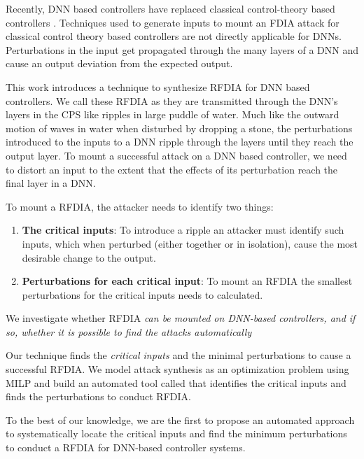 Recently,  \ac{DNN} based controllers have replaced classical control-theory based controllers \cite{xiang18} \cite{Kocic2019} \cite{bechtel2017deeppicar}.  
Techniques used to generate inputs to mount an FDIA attack for classical control theory based controllers are not directly applicable for DNNs. Perturbations in the input get propagated through the many layers of a DNN  and cause an output deviation from the expected output. 
 
This work introduces a technique to synthesize \ac{RFDIA} for DNN based controllers. 
We call these \ac{RFDIA} as they are transmitted through the DNN's layers in the CPS like ripples in large puddle of water. 
Much like the outward motion of waves in water when disturbed by dropping a stone, the perturbations introduced to the inputs to a DNN ripple through the layers until they reach the output layer. 
To mount a successful attack on a DNN based controller, we need to distort an input to the extent that the effects of its perturbation reach the final layer in a DNN. 

To mount a \ac{RFDIA}, the attacker needs to identify two things: 
\begin{enumerate}
	\item \textbf{The critical inputs}: To introduce a ripple an attacker must identify such inputs, which when perturbed (either together or in isolation), cause the most desirable change to the output.
	\item \textbf{Perturbations for each critical input}: To mount an \ac{RFDIA} the smallest perturbations for the critical inputs needs to calculated.   
\end{enumerate}


We investigate whether { \ac{RFDIA} \em can be mounted on DNN-based controllers, and if so, whether it is possible to find the attacks automatically}
                                                   
Our technique finds the \textit{critical inputs} and the minimal perturbations to cause a successful \ac{RFDIA}. We model attack synthesis as an optimization problem using \ac{MILP} and build an automated tool called \tool that identifies the critical inputs and finds the perturbations to conduct \ac{RFDIA}. 


To the best of our knowledge, we are the first to  propose an automated approach to systematically locate the critical inputs and find the minimum perturbations to conduct a \ac{RFDIA} for DNN-based controller systems.

